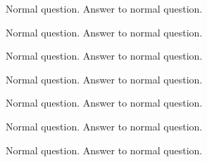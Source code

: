 \documentclass{../../flashcards}
\begin{document}
\begin{card}{\blindtext[4]}
\blindtext[4]
\end{card}


\begin{card}{Normal question.}
Answer to normal question.
\end{card}


\begin{card}{\blindtext[4]}
\blindtext[4]
\end{card}


\begin{card}{Normal question.}
Answer to normal question.
\end{card}


\begin{card}{\blindtext[4]}
\blindtext[4]
\end{card}


\begin{card}{Normal question.}
Answer to normal question.
\end{card}


\begin{card}{\blindtext[4]}
\blindtext[4]
\end{card}


\begin{card}{Normal question.}
Answer to normal question.
\end{card}


\begin{card}{\blindtext[4]}
\blindtext[4]
\end{card}


\begin{card}{Normal question.}
Answer to normal question.
\end{card}


\begin{card}{\blindtext[4]}
\blindtext[4]
\end{card}


\begin{card}{Normal question.}
Answer to normal question.
\end{card}


\begin{card}{\blindtext[4]}
\blindtext[4]
\end{card}


\begin{card}{Normal question.}
Answer to normal question.
\end{card}


\begin{card}{\blindtext[4]}
\blindtext[4]
\end{card}
\end{document}

